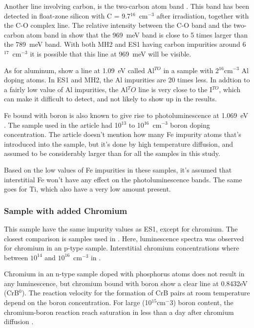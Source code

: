 Another line involving carbon, is the two-carbon atom band \cite{davies88}. This band has been detected in float-zone silicon with C = 9.7$^{16}$~cm$^{-3}$ after irradiation, together with the C-O complex line. The relative intensity between the C-O band and the two-carbon atom band in \cite{davies88} show that the 969~meV band is close to 5 times larger than the 789~meV band. With both MH2 and ES1 having carbon impurities around 6$^{17}$~cm$^{-3}$ it is possible that this line at 969~meV will be visible. 

As for aluminum, \cite{dean67} show a line at 1.09~eV called Al$^{TO}$ in a sample with 2$^{16}$cm$^{-3}$ Al doping atoms. In ES1 and MH2, the Al impurities are 20 times less. In addtion to a fairly low value of Al impurities, the Al$^TO$ line is very close to the I$^{TO}$, which can make it difficult to detect, and not likely to show up in the results.

Fe bound with boron is also known to give rise to photoluminescence at 1.069~eV \cite{mohring83}. The sample used in the article had  10$^{13}$ to 10$^{16}$~cm$^{-3}$ boron doping concentration. The article doesn't mention how many Fe impurity atoms that's introduced into the sample, but it's done by high temperature diffusion, and assumed to be considerably larger than for all the samples in this study. 

Based on the low values of Fe impurities in these samples, it's assumed that interstitial Fe won't have any effect on the photoluminescence bands. The same goes for Ti, which also have a very low amount present.


\subsubsection{Sample with added Chromium}

This sample have the same impurity values as ES1, except for chromium. The closest comparison is samples used in \cite{conzelmann82}. Here, luminescence spectra was observed for chromium in an p-type sample. Interstitial chromium concentrations where between $10^{14}$ and $10^{16} $~cm$^{-3}$ in \cite{conzelmann82}.

Chromium in an n-type sample doped with phosphorus atoms does not result in any luminescence, but chromium bound with boron show a clear line at 0.8432eV (CrB$^0$). The reaction velocity for the formation of CrB pairs at room temperature depend on the boron concentration. For large (10$^15$cm$^-3$) boron content, the chromium-boron reaction reach saturation in less than a day after chromium diffusion \cite{conzelmann82}.

